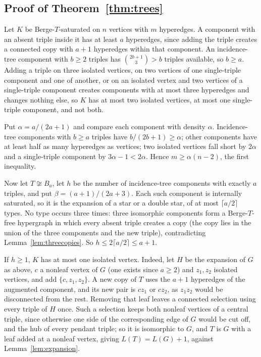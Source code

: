 \documentclass[11pt]{article}
\theoremstyle{definition}
\theoremstyle{remark}
\begin{document}
\subsection{Proof of Theorem~\ref{thm:trees}}

Let $K$ be Berge-$T$-saturated on $n$ vertices with $m$ hyperedges. A
component with an absent triple inside it has at least $a$ hyperedges, since
adding the triple creates a connected copy with $a+1$ hyperedges within that
component. An incidence-tree component with $b\ge2$ triples has
$\binom{2b+1}3>b$ triples available, so $b\ge a$. Adding a triple on three
isolated vertices, on two vertices of one single-triple component and one of
another, or on an isolated vertex and two vertices of a single-triple
component creates components with at most three hyperedges and changes
nothing else, so $K$ has at most two isolated vertices, at most one
single-triple component, and not both.

Put $\alpha=a/(2a+1)$ and compare each component with density $\alpha$.
Incidence-tree components with $b\ge a$ triples have $b/(2b+1)\ge\alpha$;
other components have at least half as many hyperedges as vertices; two
isolated vertices fall short by $2\alpha$ and a single-triple component by
$3\alpha-1<2\alpha$. Hence $m\ge\alpha(n-2)$, the first inequality.

Now let $T\not\cong B_a$, let $h$ be the number of incidence-tree
components with exactly $a$ triples, and put $\beta=(a+1)/(2a+3)$. Each such
component is internally saturated, so it is the expansion of a star or a
double star, of at most $\lceil a/2\rceil$ types. No type occurs three
times: three isomorphic components form a Berge-$T$-free hypergraph in which
every absent triple creates a copy (the copy lies in the union of the
three components and the new triple), contradicting
Lemma~\ref{lem:threecopies}. So $h\le2\lceil a/2\rceil\le a+1$.

If $h\ge1$, $K$ has at most one isolated vertex. Indeed, let $H$ be the
expansion of $G$ as above, $c$ a nonleaf vertex of $G$ (one exists since
$a\ge2$) and $z_1,z_2$
isolated vertices, and add $\{c,z_1,z_2\}$. A new copy of $T$ uses the $a+1$
hyperedges of the augmented component, and its new pair is $cz_1$ or $cz_2$,
as $z_1z_2$ would be disconnected from the rest. Removing that leaf leaves a
connected selection using every triple of $H$ once. Such a selection keeps
both nonleaf vertices of a central triple, since otherwise one side of the
corresponding edge of $G$ would be cut off, and the hub of every pendant
triple; so it is isomorphic to $G$, and $T$ is $G$ with a leaf added at a
nonleaf vertex, giving $L(T)=L(G)+1$, against Lemma~\ref{lem:expansion}.
\end{document}

